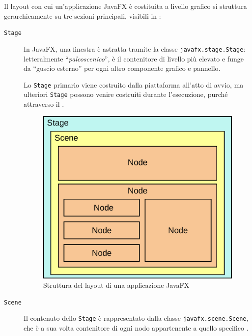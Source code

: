             Il layout con cui un'applicazione JavaFX è costituita a livello grafico si struttura gerarchicamente su tre sezioni principali, visibili in :

            \begin{description}
                \item[\texttt{Stage}]\label{itm:stg}
                    In JavaFX, una finestra è astratta tramite la classe \texttt{javafx\dothyp stage\dothyp Stage}:
                    letteralmente ``\emph{palcoscenico}'',  è il contenitore di livello più elevato e funge da ``guscio esterno'' per ogni altro componente grafico e pannello.

                    Lo \texttt{Stage} primario viene costruito dalla piattaforma all'atto di avvio, ma ulteriori \texttt{Stage} possono venire costruiti durante l'esecuzione, purché attraverso il .

                    \begin{figure}[htbp]
                        \centering
                        \includegraphics[scale=0.12]{img/Javafx-stage-scene-node}
                        \caption{Struttura del layout di una applicazione JavaFX}
                        \label{fig:jfxStage}
                    \end{figure}

                \item[\texttt{Scene}]\label{itm:scn}
                    Il contenuto dello \texttt{Stage} è rappresentato dalla classe \texttt{javafx\dothyp scene\dothyp Scene}, che è a sua volta contenitore di ogni nodo appartenente a quello specifico .


\end{description}
